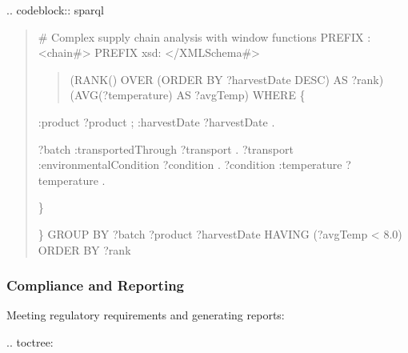 \documentclass[letterpaper,10pt,english]{sphinxmanual}
\begin{document}
\sphinxAtStartPar
{}
.. code\sphinxhyphen{}block:: sparql
\begin{quote}

\sphinxAtStartPar
\# Complex supply chain analysis with window functions
PREFIX : \textless{}\sphinxhyphen{}chain\#\textgreater{}
PREFIX xsd: \textless{}/XMLSchema\#\textgreater{}
\begin{description}
\begin{quote}

\sphinxAtStartPar
(RANK() OVER (ORDER BY ?harvestDate DESC) AS ?rank)
(AVG(?temperature) AS ?avgTemp) WHERE \{
\end{quote}
\begin{description}
\sphinxAtStartPar
:product ?product ;
:harvestDate ?harvestDate .

\sphinxAtStartPar
?batch :transportedThrough ?transport .
?transport :environmentalCondition ?condition .
?condition :temperature ?temperature .

\end{description}

\sphinxAtStartPar
\}

\end{description}

\sphinxAtStartPar
\}
GROUP BY ?batch ?product ?harvestDate
HAVING (?avgTemp \textless{} 8.0)
ORDER BY ?rank
\end{quote}


\subsubsection{Compliance and Reporting}
\label{\detokenize{user-guide/index:compliance-and-reporting}}
\sphinxAtStartPar
Meeting regulatory requirements and generating reports:

\sphinxAtStartPar
{}
.. toctree:

\begin{sphinxVerbatim}[commandchars=\\\{\}]
 
   

\end{sphinxVerbatim}
\end{document}
